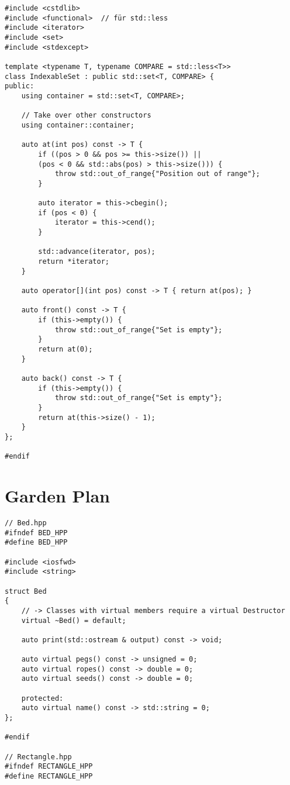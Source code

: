 \begin{multicols*}{3}
\begin{verbatim}
#include <cstdlib>
#include <functional>  // für std::less
#include <iterator>
#include <set>
#include <stdexcept>

template <typename T, typename COMPARE = std::less<T>>
class IndexableSet : public std::set<T, COMPARE> {
public:
    using container = std::set<T, COMPARE>;

    // Take over other constructors
    using container::container;

    auto at(int pos) const -> T {
        if ((pos > 0 && pos >= this->size()) ||
        (pos < 0 && std::abs(pos) > this->size())) {
            throw std::out_of_range{"Position out of range"};
        }

        auto iterator = this->cbegin();
        if (pos < 0) {
            iterator = this->cend();
        }

        std::advance(iterator, pos);
        return *iterator;
    }

    auto operator[](int pos) const -> T { return at(pos); }

    auto front() const -> T {
        if (this->empty()) {
            throw std::out_of_range{"Set is empty"};
        }
        return at(0);
    }

    auto back() const -> T {
        if (this->empty()) {
            throw std::out_of_range{"Set is empty"};
        }
        return at(this->size() - 1);
    }
};

#endif
\end{verbatim}

\section{Garden Plan}
\begin{verbatim}
// Bed.hpp
#ifndef BED_HPP
#define BED_HPP

#include <iosfwd>
#include <string>

struct Bed
{
    // -> Classes with virtual members require a virtual Destructor
    virtual ~Bed() = default;

    auto print(std::ostream & output) const -> void;

    auto virtual pegs() const -> unsigned = 0;
    auto virtual ropes() const -> double = 0;
    auto virtual seeds() const -> double = 0;

    protected:
    auto virtual name() const -> std::string = 0;
};

#endif

// Rectangle.hpp
#ifndef RECTANGLE_HPP
#define RECTANGLE_HPP


\end{verbatim}
\end{multicols*}

